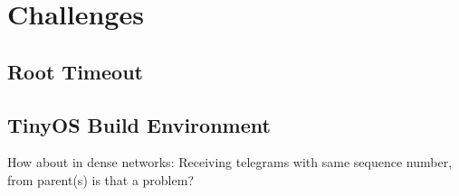 \documentclass[Main]{subfiles}
\begin{document}
\section{Challenges} %
\label{sec:challenges}

	\subsection{Root Timeout} %
	\label{sub:root_timeout}
		

	\subsection{TinyOS Build Environment} %
	\label{sub:tinyos_build_environment}
		

	How about in dense networks: Receiving telegrams with same sequence number, from parent(s) is that a problem?

\end{document}

